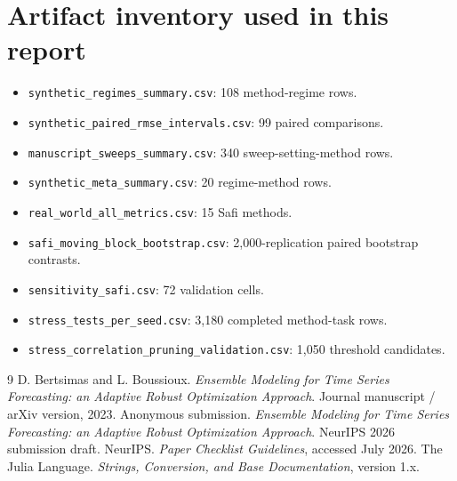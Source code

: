 \documentclass[10pt]{report}
\begin{document}
\appendix
\chapter{Artifact inventory used in this report}
\begin{itemize}
\item \texttt{synthetic\_regimes\_summary.csv}: 108 method-regime rows.
\item \texttt{synthetic\_paired\_rmse\_intervals.csv}: 99 paired comparisons.
\item \texttt{manuscript\_sweeps\_summary.csv}: 340 sweep-setting-method rows.
\item \texttt{synthetic\_meta\_summary.csv}: 20 regime-method rows.
\item \texttt{real\_world\_all\_metrics.csv}: 15 Safi methods.
\item \texttt{safi\_moving\_block\_bootstrap.csv}: 2,000-replication paired bootstrap contrasts.
\item \texttt{sensitivity\_safi.csv}: 72 validation cells.
\item \texttt{stress\_tests\_per\_seed.csv}: 3,180 completed method-task rows.
\item \texttt{stress\_correlation\_pruning\_validation.csv}: 1,050 threshold candidates.
\end{itemize}

\begin{thebibliography}{9}
 D. Bertsimas and L. Boussioux. \emph{Ensemble Modeling for Time Series Forecasting: an Adaptive Robust Optimization Approach}. Journal manuscript / arXiv version, 2023.
 Anonymous submission. \emph{Ensemble Modeling for Time Series Forecasting: an Adaptive Robust Optimization Approach}. NeurIPS 2026 submission draft.
 NeurIPS. \emph{Paper Checklist Guidelines}, accessed July 2026.
 The Julia Language. \emph{Strings, Conversion, and Base Documentation}, version 1.x.
\end{thebibliography}
\end{document}
